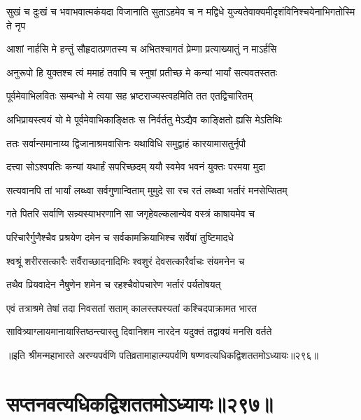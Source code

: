 


\twolineshloka
{सुखं च दुःखं च भवाभवात्मकंयदा विजानाति सुताऽहमेव च}
{न मद्विधे युज्यतेवाक्यमीदृशंविनिश्चयेनाभिगतोस्मि ते नृप}


\twolineshloka
{आशां नार्हसि मे हन्तुं सौहृदात्प्रणतस्य च}
{अभितश्चागतं प्रेम्णा प्रत्याख्यातुं न माऽर्हसि}


\twolineshloka
{अनुरूपो हि युक्तश्च त्वं ममाहं तवापि च}
{स्नुषां प्रतीच्छ मे कन्यां भार्यां सत्यवतस्ततः}




\twolineshloka
{पूर्वमेवाभिलवितः सम्बन्धो मे त्वया सह}
{भ्रष्टराज्यस्त्वहमिति तत एतद्विचारितम्}


\twolineshloka
{अभिप्रायस्त्वयं यो मे पूर्वमेवाभिकाङ्क्षितः}
{स निर्वर्ततु मेऽद्यैव काङ्क्षितो ह्यसि मेऽतिथिः}


\twolineshloka
{ततः सर्वान्समानाय्य द्विजानाश्रमवासिनः}
{यथाविधि समुद्वाहं कारयामासतुर्नृपौ}


\twolineshloka
{दत्त्वा सोऽश्वपतिः कन्यां यथार्हं सपरिच्छदम्}
{ययौ स्वमेव भवनं युक्तः परमया मुदा}


\twolineshloka
{सत्यवानपि तां भार्यां लब्ध्वा सर्वगुणान्विताम्}
{मुमुदे सा रच रतं लब्ध्वा भर्तारं मनसेप्सितम्}


\twolineshloka
{गते पितरि सर्वाणि सन्न्यस्याभरणानि सा}
{जगृहेवल्कलान्येव वस्त्रं काषायमेव च}


\twolineshloka
{परिचारैर्गुणैश्चैव प्रश्रयेण दमेन च}
{सर्वकामक्रियाभिश्च सर्वेषां तुष्टिमादधे}


\twolineshloka
{श्वश्रूं शरीरसत्कारैः सर्वैराच्छादनादिभिः}
{श्वशुरं देवसत्कारैर्वाचः संयमनेन च}


\twolineshloka
{तथैव प्रियवादेन नैषुणेन शमेन च}
{रहश्चैवोपचारेण भर्तारं पर्यतोषयत्}


\twolineshloka
{एवं तत्राश्रमे तेषां तदा निवसतां सताम्}
{कालस्तपस्यतां कश्चिदपाक्रामत भारत}


\twolineshloka
{सावित्र्याग्लायमानायास्तिष्ठन्त्यास्तु दिवानिशम}
{नारदेन यदुक्तं तद्वाक्यं मनसि वर्तते}


॥इति श्रीमन्महाभारते अरण्यपर्वणि पतिव्रतामाहात्म्यपर्वणि षण्णवत्यधिकद्विशततमोऽध्यायः॥२९६॥


\chapter{सप्तनवत्यधिकद्विशततमोऽध्यायः॥२९७॥}



